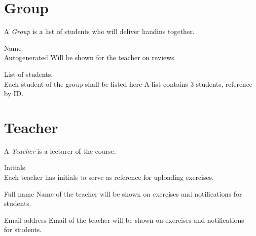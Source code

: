 \documentclass[Main]{subfiles}
\begin{document}

\section{Group}
A \textit{Group} is a list of students who will deliver handins together.
\begin{DataIntro}
\rExample{}
\end{DataIntro}

\newpage
\begin{DataTable}

\Record
{Name\\
Autogenerated}
{Will be shown for the teacher on reviews.}
{}


\Record
{List of students.\\
Each student of the group shall be listed here}
{A list contains 3 students, reference by ID.}
{}


\end{DataTable}





\section{Teacher}
A \textit{Teacher} is a lecturer of the course.

\begin{DataIntro}
\rExample{}
\end{DataIntro}

\begin{DataTable}

\Record
{Initials\\
Each teacher has initials to serve as reference for uploading exercises.}
{}
{}

\Record
{Full name}
{Name of the teacher will be shown on exercises and notifications for students.}
{}

\Record
{Email address}
{Email of the teacher will be shown on exercises and notifications for students.}
{}

\end{DataTable}
\end{document}
